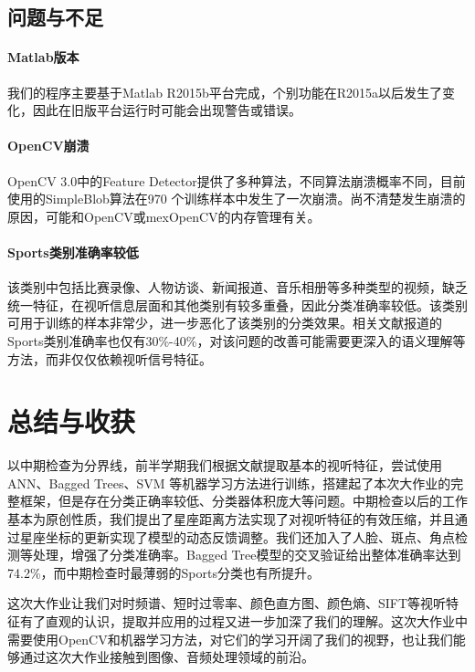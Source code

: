 \documentclass{article}
\begin{document}
\begin{multicols}{2}
        \subsection{问题与不足}
            \paragraph{Matlab版本}
            我们的程序主要基于Matlab R2015b平台完成，个别功能在R2015a以后发生了变化，因此在旧版平台运行时可能会出现警告或错误。

            \paragraph{OpenCV崩溃}
            OpenCV 3.0中的Feature Detector提供了多种算法，不同算法崩溃概率不同，目前使用的SimpleBlob算法在970 个训练样本中发生了一次崩溃。尚不清楚发生崩溃的原因，可能和OpenCV或mexOpenCV的内存管理有关。
            
            \paragraph{Sports类别准确率较低}
            该类别中包括比赛录像、人物访谈、新闻报道、音乐相册等多种类型的视频，缺乏统一特征，在视听信息层面和其他类别有较多重叠，因此分类准确率较低。该类别可用于训练的样本非常少，进一步恶化了该类别的分类效果。相关文献报道的Sports类别准确率也仅有30\%-40\%，对该问题的改善可能需要更深入的语义理解等方法，而非仅仅依赖视听信号特征。

    \section{总结与收获}
        以中期检查为分界线，前半学期我们根据文献\cite{webvideo}提取基本的视听特征，尝试使用ANN、Bagged Trees、SVM 等机器学习方法进行训练，搭建起了本次大作业的完整框架，但是存在分类正确率较低、分类器体积庞大等问题。中期检查以后的工作基本为原创性质，我们提出了星座距离方法实现了对视听特征的有效压缩，并且通过星座坐标的更新实现了模型的动态反馈调整。我们还加入了人脸、斑点、角点检测等处理，增强了分类准确率。Bagged Tree模型的交叉验证给出整体准确率达到74.2\%，而中期检查时最薄弱的Sports分类也有所提升。

        这次大作业让我们对时频谱、短时过零率、颜色直方图、颜色熵、SIFT等视听特征有了直观的认识，提取并应用的过程又进一步加深了我们的理解。这次大作业中需要使用OpenCV和机器学习方法，对它们的学习开阔了我们的视野，也让我们能够通过这次大作业接触到图像、音频处理领域的前沿。


    
    

\end{multicols}
\end{document}
